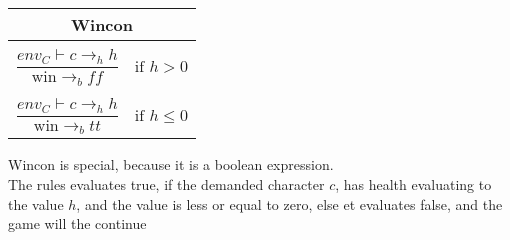 \begin{center}
\begin{tabular}{ l l }
\multicolumn{2}{c}{\textbf{Wincon}}\\
\hline
 & \\
$\dfrac{env_{C} \vdash c \rightarrow_{h} h}{\text{win} \rightarrow_{b} ff}$ & $\text{if } h > 0$\\
 & \\
$\dfrac{env_{C} \vdash c \rightarrow_{h} h}{\text{win} \rightarrow_{b} tt}$ & $\text{if } h \leq 0$\\
\end{tabular}
\end{center}
Wincon is special, because it is a boolean expression. \\
The rules evaluates true, if the demanded character $c$, has health evaluating to the value $h$, and the value is less or equal to zero, else et evaluates false, and the game will the continue 
\pagebreak